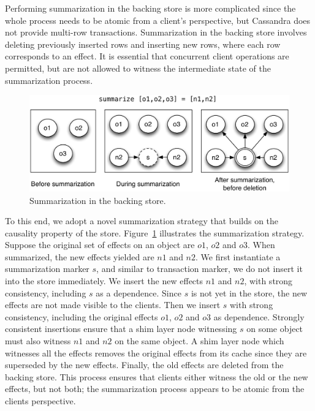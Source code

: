 Performing summarization in the backing store is more complicated since the
whole process needs to be atomic from a client's perspective, but Cassandra
does not provide multi-row transactions. Summarization in the backing store
involves deleting previously inserted rows and inserting new rows, where each
row corresponds to an effect. It is essential that concurrent client operations
are permitted, but are not allowed to witness the intermediate state of the
summarization process.

\begin{figure}
\begin{center}
\includegraphics[width=\columnwidth]{Figures/SumDisk}
\end{center}
\caption{Summarization in the backing store.}
\label{fig:impl_sum_disk}
\end{figure}

To this end, we adopt a novel summarization strategy that builds on the
causality property of the store. Figure~\ref{fig:impl_sum_disk} illustrates the
summarization strategy. Suppose the original set of effects on an object are
$o1$, $o2$ and $o3$. When summarized, the new effects yielded are $n1$ and
$n2$. We first instantiate a summarization marker $s$, and similar to
transaction marker, we do not insert it into the store immediately. We insert
the new effects $n1$ and $n2$, with strong consistency, including $s$ as a
dependence. Since $s$ is not yet in the store, the new effects are not made
visible to the clients. Then we insert $s$ with strong consistency, including
the original effects $o1$, $o2$ and $o3$ as dependence. Strongly consistent
insertions ensure that a shim layer node witnessing $s$ on some object must
also witness $n1$ and $n2$ on the same object. A shim layer node which
witnesses all the effects removes the original effects from its cache since
they are superseded by the new effects. Finally, the old effects are deleted
from the backing store. This process ensures that clients either witness the
old or the new effects, but not both; the summarization process appears to be
atomic from the clients perspective.

